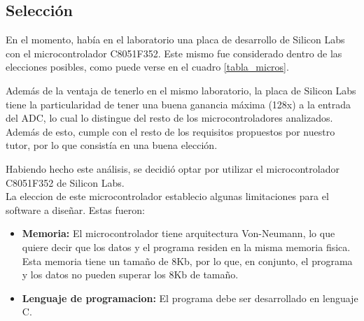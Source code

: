 \subsection{Selección} %
\label{sub:seleccion}

En el momento, había en el laboratorio una placa de desarrollo de Silicon Labs con el microcontrolador C8051F352. Este mismo fue considerado dentro de las elecciones posibles, como puede verse en el cuadro \ref{tabla_micros}.

Además de la ventaja de tenerlo en el mismo laboratorio, la placa de Silicon Labs tiene la particularidad de tener una buena ganancia máxima (128x) a la entrada del ADC, lo cual lo distingue del resto de los microcontroladores analizados. Además de esto, cumple con el resto de los requisitos propuestos por nuestro tutor, por lo que consistía en una buena elección.

Habiendo hecho este análisis, se decidió optar por utilizar el microcontrolador C8051F352 de Silicon Labs. \\

La eleccion de este microcontrolador establecio algunas limitaciones para el software a diseñar. Estas fueron:

\begin{itemize}
  \item \textbf{Memoria:} El microcontrolador tiene arquitectura Von-Neumann, lo que quiere decir que los datos y el programa residen en la misma memoria fisica. Esta memoria tiene un tamaño de 8Kb, por lo que, en conjunto, el programa y los datos no pueden superar los 8Kb de tamaño.
  \item \textbf{Lenguaje de programacion:} El programa debe ser desarrollado en lenguaje C.
\end{itemize}






